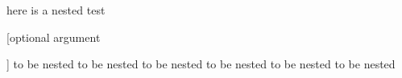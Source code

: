 here is a nested test
\begin{one}


	[optional argument

	]
	to be nested to be nested
	to be nested to be nested
	to be nested to be nested
\end{one}
